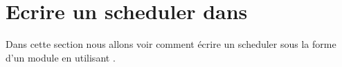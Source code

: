 \section{Ecrire un scheduler dans \ipa}
Dans cette section nous allons voir comment écrire un scheduler sous la forme d'un module en utilisant \ipa.